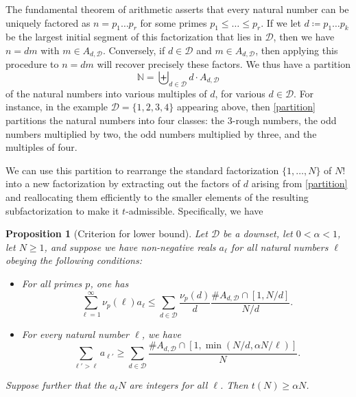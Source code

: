 \documentclass[12pt,a4paper,reqno]{amsart}
\numberwithin{equation}{section}
\theoremstyle{plain}
\newtheorem{proposition}[theorem]{Proposition}
\theoremstyle{definition}
\newcommand\N{\mathbb{N}}
\begin{document}
The fundamental theorem of arithmetic asserts that every natural number can be uniquely factored as $n = p_1 \dots p_r$ for some primes $p_1 \leq \dots \leq p_r$.  If we let $d \coloneqq p_1 \dots p_k$ be the largest initial segment of this factorization that lies in ${\mathcal D}$, then we have $n=dm$ with $m \in A_{d,{\mathcal D}}$.  Conversely, if $d \in {\mathcal D}$ and $m \in A_{d,{\mathcal D}}$, then applying this procedure to $n=dm$ will recover precisely these factors.  We thus have a partition
\begin{equation}\label{partition}
 \N = \biguplus_{d \in {\mathcal D}} d \cdot A_{d,{\mathcal D}}
\end{equation}
of the natural numbers into various multiples of $d$, for various $d \in {\mathcal D}$.  For instance, in the example ${\mathcal D} = \{1,2,3,4\}$ appearing above, then \eqref{partition} partitions the natural numbers into four classes: the $3$-rough numbers, the odd numbers multiplied by two, the odd numbers multiplied by three, and the multiples of four.

We can use this partition to rearrange the standard factorization $\{1,\dots,N\}$ of $N!$ into a new factorization by extracting out the factors of $d$ arising from \eqref{partition} and reallocating them efficiently to the smaller elements of the resulting subfactorization to make it $t$-admissible.  Specifically, we have

\begin{proposition}[Criterion for lower bound]\label{rearrange-crit}  Let ${\mathcal D}$ be a downset, let $0 < \alpha < 1$, let $N \geq 1$, and suppose we have non-negative reals $a_\ell$ for all natural numbers $\ell$ obeying the following conditions:
  \begin{itemize}
  \item[(i)]  For all primes $p$, one has
  \begin{equation}\label{i-eq-1}
     \sum_{\ell=1}^\infty \nu_p(\ell) a_\ell  \leq \sum_{d \in {\mathcal D}} \frac{\nu_p(d)}{d} \frac{\# A_{d,{\mathcal D}} \cap [1,N/d]}{N/d}.
  \end{equation}
  \item[(ii)]  For every natural number $\ell$, we have
  \begin{equation}\label{l-eq-1} \sum_{\ell' > \ell} a_{\ell'} \geq \sum_{d \in {\mathcal D}} \frac{\# A_{d,{\mathcal D}} \cap [1,\min(N/d, \alpha N/\ell)]}{N}.
  \end{equation}
  \end{itemize}
  Suppose further that the $a_\ell N$ are integers for all $\ell$.   Then $t(N) \geq \alpha N$.
  \end{proposition}
\end{document}
